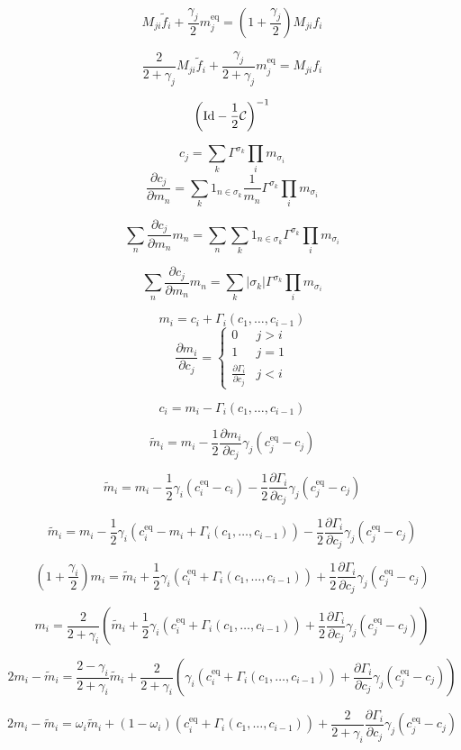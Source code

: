 \documentclass{article}
\newcommand{\rr}[2]{\frac{\partial #1}{\partial #2}}
\newcommand{\eq}{\text{eq}}
\newcommand{\f}{\tilde{f}}
\newcommand{\m}{\tilde{m}}
\begin{document}
\[M_{ji}\f_i + \frac{\gamma_j}{2}m^\eq_j = (1+\frac{\gamma_j}{2})M_{ji}f_i\]

\[\frac{2}{2+\gamma_j}M_{ji}\f_i + \frac{\gamma_j}{2+\gamma_j}m^\eq_j = M_{ji}f_i\]


\newpage

\[\left(\text{Id} - \frac{1}{2}\mathcal{C}\right)^{-1}\]

\newpage

\[c_j = \sum_k \Gamma^{\sigma_k}\prod_i m_{\sigma_i}\]
\[\rr{c_j}{m_n} = \sum_k 1_{n\in\sigma_k}\frac{1}{m_n}\Gamma^{\sigma_k}\prod_i m_{\sigma_i}\]

\[\sum_n\rr{c_j}{m_n}m_n = \sum_n\sum_k 1_{n\in\sigma_k}\Gamma^{\sigma_k}\prod_i m_{\sigma_i}\]

\[\sum_n\rr{c_j}{m_n}m_n = \sum_k |\sigma_k|\Gamma^{\sigma_k}\prod_i m_{\sigma_i}\]



\newpage


\[m_i = c_i + \Gamma_i(c_1,\ldots,c_{i-1})\]
\[\rr{m_i}{c_j} = \begin{cases}
0 & j > i\\
1 & j = 1\\
\rr{\Gamma_i}{c_j} & j < i
\end{cases}\]

\[c_i = m_i - \Gamma_i(c_1,\ldots,c_{i-1})\]


\[\m_i = m_i - \frac{1}{2}\rr{m_i}{c_j}\gamma_j(c^\eq_j-c_j)\]

\[\m_i = m_i - \frac{1}{2}\gamma_i(c^\eq_i-c_i) - \frac{1}{2}\rr{\Gamma_i}{c_j}\gamma_j(c^\eq_j-c_j)\]

\[\m_i = m_i - \frac{1}{2}\gamma_i(c^\eq_i-m_i + \Gamma_i(c_1,\ldots,c_{i-1})) - \frac{1}{2}\rr{\Gamma_i}{c_j}\gamma_j(c^\eq_j-c_j)\]


\[(1+\frac{\gamma_i}{2}) m_i = \m_i + \frac{1}{2}\gamma_i(c^\eq_i + \Gamma_i(c_1,\ldots,c_{i-1})) + \frac{1}{2}\rr{\Gamma_i}{c_j}\gamma_j(c^\eq_j-c_j)\]

\[m_i = \frac{2}{2+\gamma_i}\left(\m_i + \frac{1}{2}\gamma_i(c^\eq_i + \Gamma_i(c_1,\ldots,c_{i-1})) + \frac{1}{2}\rr{\Gamma_i}{c_j}\gamma_j(c^\eq_j-c_j)\right)\]


\[2m_i - \m_i = \frac{2-\gamma_i}{2+\gamma_i}\m_i + \frac{2}{2+\gamma_i}\left(\gamma_i(c^\eq_i + \Gamma_i(c_1,\ldots,c_{i-1})) + \rr{\Gamma_i}{c_j}\gamma_j(c^\eq_j-c_j)\right)\]


\[2m_i - \m_i = \omega_i\m_i + (1-\omega_i)(c^\eq_i + \Gamma_i(c_1,\ldots,c_{i-1})) + \frac{2}{2+\gamma_i}\rr{\Gamma_i}{c_j}\gamma_j(c^\eq_j-c_j)\]
\end{document}

